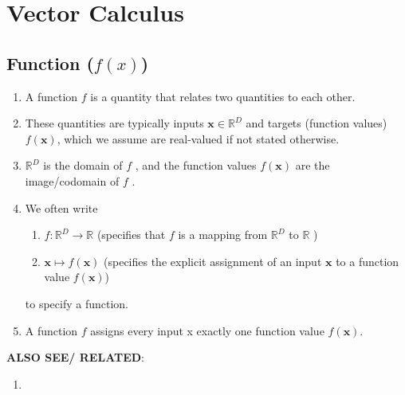 \chapter{Vector Calculus}

\section{Function ($f(x)$)}

\begin{enumerate}
    \item A function $f$ is a quantity that relates two quantities to each other. 
    \hfill \cite{mfml/book/mml/Deisenroth-Faisal-Ong}

    \item These quantities are typically inputs $\bm{x} \in \mathbb{R}^D$ and targets (function values) $f (\bm{x})$, which we assume are real-valued if not stated otherwise. 
    \hfill \cite{mfml/book/mml/Deisenroth-Faisal-Ong}
    
    \item $\mathbb{R}^D$ is the domain of $f$ , and the function values $f (\bm{x})$ are the image/codomain of $f$ .
    \hfill \cite{mfml/book/mml/Deisenroth-Faisal-Ong}

    \item We often write 
    \hfill \cite{mfml/book/mml/Deisenroth-Faisal-Ong}
    \begin{enumerate}
        \item $f: \mathbb{R}^D \to \mathbb{R}$ 
        (specifies that $f$ is a mapping from $\mathbb{R}^D$ to $\mathbb{R}$ )
        \hfill \cite{mfml/book/mml/Deisenroth-Faisal-Ong}
        
        \item $\bm{x} \mapsto f(\bm{x})$ 
        (specifies the explicit assignment of an input $\bm{x}$ to a function value $f(\bm{x})$)
        \hfill \cite{mfml/book/mml/Deisenroth-Faisal-Ong}
    \end{enumerate}
    to specify a function.
    \hfill \cite{mfml/book/mml/Deisenroth-Faisal-Ong}

    \item A function $f$ assigns every input x exactly one function value $f (\bm{x})$.
    \hfill \cite{mfml/book/mml/Deisenroth-Faisal-Ong}
\end{enumerate}

\vspace{0.5cm}
\textbf{ALSO SEE/ RELATED}:
\begin{enumerate}
    \item {}
\end{enumerate}



